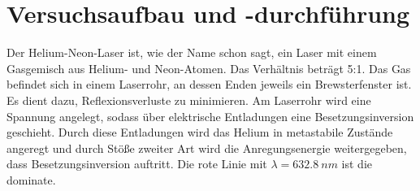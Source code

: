 \section{Versuchsaufbau und -durchführung}
Der Helium-Neon-Laser ist, wie der Name schon sagt, ein Laser mit einem Gasgemisch aus Helium- und Neon-Atomen.
Das Verhältnis beträgt 5:1.
Das Gas befindet sich in einem Laserrohr, an dessen Enden jeweils ein Brewsterfenster ist. Es dient dazu, Reflexionsverluste zu minimieren.
Am Laserrohr wird eine Spannung angelegt, sodass über elektrische Entladungen eine Besetzungsinversion geschieht.
Durch diese Entladungen wird das Helium in metastabile Zustände angeregt und durch Stöße zweiter Art wird die Anregungsenergie weitergegeben, dass Besetzungsinversion auftritt.
Die rote Linie mit $\lambda = \SI{632.8}{nm}$ ist die dominate.
